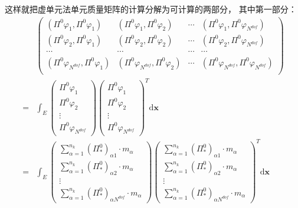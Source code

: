 这样就把虚单元法单元质量矩阵的计算分解为可计算的两部分， 其中第一部分：\\
\begin{equation*}
\begin{aligned}
&\begin{pmatrix}
(\Pi^0\varphi_1, \Pi^0\varphi_1) & (\Pi^0\varphi_1, \Pi^0\varphi_2) & \cdots & (\Pi^0\varphi_1, \Pi^0\varphi_{N^{dof}})\\
(\Pi^0\varphi_2, \Pi^0\varphi_1) & (\Pi^0\varphi_2, \Pi^0\varphi_2) & \cdots & (\Pi^0\varphi_2, \Pi^0\varphi_{N^{dof}})\\
\cdots & \cdots & \cdots & \cdots \\
(\Pi^0\varphi_{N^{dof}}, \Pi^0\varphi_1) & (\Pi^0\varphi_{N^{dof}}, \Pi^0\varphi_2) & \cdots & (\Pi^0\varphi_{N^{dof}}, \Pi^0\varphi_{N^{dof}})\\
\end{pmatrix}\\
= & \int_E \begin{pmatrix} 
\Pi^0\varphi_1\\ 
\Pi^0\varphi_2 \\ 
\vdots\\
\Pi^0\varphi_{N^{dof}}
\end{pmatrix}\begin{pmatrix} 
\Pi^0\varphi_1\\ 
\Pi^0\varphi_2 \\ 
\vdots\\
\Pi^0\varphi_{N^{dof}}
\end{pmatrix}^T\mathrm d \mathbf x\\
= & \int_E \begin{pmatrix} 
\sum_{\alpha = 1}^{n_k}(\Pi_{*}^{0})_{\alpha 1}\cdot m_{\alpha}\\ 
\sum_{\alpha = 1}^{n_k}(\Pi_{*}^{0})_{\alpha 2}\cdot m_{\alpha} \\ 
\vdots\\
\sum_{\alpha = 1}^{n_k}(\Pi_{*}^{0})_{\alpha N^{dof}}\cdot m_{\alpha}
\end{pmatrix}\begin{pmatrix} 
\sum_{\alpha = 1}^{n_k}(\Pi_{*}^{0})_{\alpha 1}\cdot m_{\alpha}\\ 
\sum_{\alpha = 1}^{n_k}(\Pi_{*}^{0})_{\alpha 2}\cdot m_{\alpha} \\ 
\vdots\\
\sum_{\alpha = 1}^{n_k}(\Pi_{*}^{0})_{\alpha N^{dof}}\cdot m_{\alpha}
\end{pmatrix}^T\mathrm d \mathbf x\\

\end{aligned}
\end{equation*}
